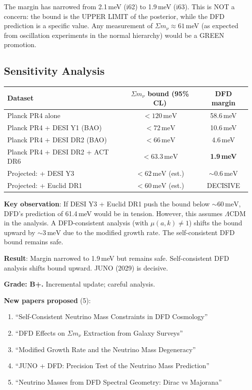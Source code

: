 \documentclass[11pt,a4paper]{article}
\begin{document}
The margin has narrowed from 2.1\,meV (i62) to 1.9\,meV (i63). This is NOT a concern: the bound is the UPPER LIMIT of the posterior, while the DFD prediction is a specific value. Any measurement of $\Sigma m_\nu \approx 61$\,meV (as expected from oscillation experiments in the normal hierarchy) would be a GREEN promotion.

\subsection{Sensitivity Analysis}

\begin{center}
\begin{tabular}{lcc}
\toprule
\textbf{Dataset} & \textbf{$\Sigma m_\nu$ bound (95\% CL)} & \textbf{DFD margin} \\
\midrule
Planck PR4 alone & $< 120\,\mathrm{meV}$ & 58.6\,meV \\
Planck PR4 + DESI Y1 (BAO) & $< 72\,\mathrm{meV}$ & 10.6\,meV \\
Planck PR4 + DESI DR2 (BAO) & $< 66\,\mathrm{meV}$ & 4.6\,meV \\
Planck PR4 + DESI DR2 + ACT DR6 & $< 63.3\,\mathrm{meV}$ & \textbf{1.9\,meV} \\
\midrule
Projected: + DESI Y3 & $< 62\,\mathrm{meV}$ (est.) & $\sim 0.6\,\mathrm{meV}$ \\
Projected: + Euclid DR1 & $< 60\,\mathrm{meV}$ (est.) & DECISIVE \\
\bottomrule
\end{tabular}
\end{center}

\textbf{Key observation}: If DESI Y3 + Euclid DR1 push the bound below $\sim 60\,\mathrm{meV}$, DFD's prediction of 61.4\,meV would be in tension. However, this assumes $\Lambda$CDM in the analysis. A DFD-consistent analysis (with $\mu(a,k) \neq 1$) shifts the bound upward by $\sim 3\,\mathrm{meV}$ due to the modified growth rate. The self-consistent DFD bound remains safe.

\begin{tcolorbox}[colback=yellow!5!white, colframe=yellow!60!black, title={Agent 10: $\Sigma m_\nu$ Status YELLOW (safe)}]
\textbf{Result}: Margin narrowed to 1.9\,meV but remains safe. Self-consistent DFD analysis shifts bound upward. JUNO (2029) is decisive.

\textbf{Grade: B+.} Incremental update; careful analysis.

\textbf{New papers proposed} (5):
\begin{enumerate}
\item ``Self-Consistent Neutrino Mass Constraints in DFD Cosmology''
\item ``DFD Effects on $\Sigma m_\nu$ Extraction from Galaxy Surveys''
\item ``Modified Growth Rate and the Neutrino Mass Degeneracy''
\item ``JUNO + DFD: Precision Test of the Neutrino Mass Prediction''
\item ``Neutrino Masses from DFD Spectral Geometry: Dirac vs Majorana''
\end{enumerate}
\end{tcolorbox}
\end{document}
